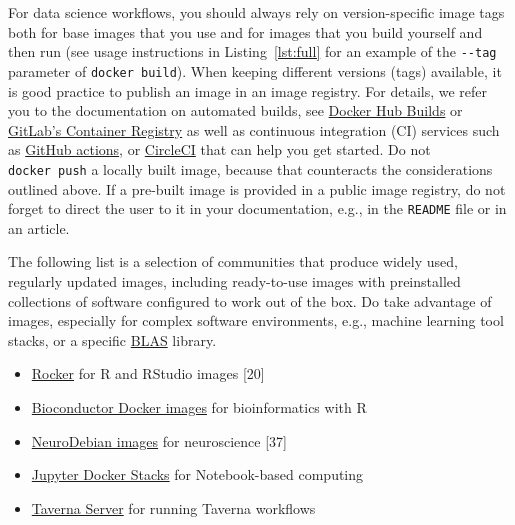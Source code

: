 \documentclass[10pt,letterpaper]{article}
\providecommand{\tightlist}{%
  \setlength{\itemsep}{0pt}\setlength{\parskip}{0pt}}
\begin{document}
For data science workflows, you should always rely on version-specific
image tags both for base images that you use and for images that you
build yourself and then run (see usage instructions in
Listing~\ref{lst:full} for an example of the \texttt{-\/-tag} parameter
of \texttt{docker\ build}). When keeping different versions (tags)
available, it is good practice to publish an image in an image registry.
For details, we refer you to the documentation on automated builds, see
\href{https://docs.docker.com/docker-hub/builds/}{Docker Hub Builds} or
\href{https://docs.gitlab.com/ee/user/packages/container_registry/index.html\#build-and-push-images}{GitLab's
Container Registry} as well as continuous integration (CI) services such
as
\href{https://github.com/actions/starter-workflows/tree/master/ci}{GitHub
actions}, or
\href{https://circleci.com/orbs/registry/orb/circleci/docker\#commands-build}{CircleCI}
that can help you get started. Do not \texttt{docker\ push} a locally
built image, because that counteracts the considerations outlined above.
If a pre-built image is provided in a public image registry, do not
forget to direct the user to it in your documentation, e.g., in the
\texttt{README} file or in an article.

The following list is a selection of communities that produce widely
used, regularly updated images, including ready-to-use images with
preinstalled collections of software configured to work out of the box.
Do take advantage of images, especially for complex software
environments, e.g., machine learning tool stacks, or a specific
\href{https://en.wikipedia.org/wiki/Basic_Linear_Algebra_Subprograms}{BLAS}
library.

\begin{itemize}
\tightlist
\item
  \href{https://www.rocker-project.org/}{Rocker} for R and RStudio
  images {[}20{]}
\item
  \href{https://bioconductor.org/help/docker/}{Bioconductor Docker
  images} for bioinformatics with R
\item
  \href{https://hub.docker.com/_/neurodebian}{NeuroDebian images} for
  neuroscience {[}37{]}
\item
  \href{https://jupyter-docker-stacks.readthedocs.io/en/latest/index.html}{Jupyter
  Docker Stacks} for Notebook-based computing
\item
  \href{https://hub.docker.com/r/taverna/taverna-server}{Taverna Server}
  for running Taverna workflows
\end{itemize}
\end{document}
